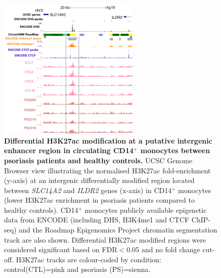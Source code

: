 \begin{figure}[ht]
\centering
\includegraphics[width=0.6\textwidth]{./Results2/pdfs/ChIPm_H3K27ac_UCSC_CD14_ILDR1_track}
\caption[Differential H3K27ac modification at a putative intergenic enhancer region in circulating CD14$^+$ monocytes between psoriasis patients and healthy controls.]{\textbf{Differential H3K27ac modification at a putative intergenic enhancer region in circulating CD14$^+$ monocytes between psoriasis patients and healthy controls.} UCSC Genome Browser view illustrating the normalised H3K27ac fold-enrichment (y-axis) at an intergenic differentially modified region located between \textit{SLC14A2} and \textit{ILDR2} genes (x-axis) in CD14$^+$ monocytes (lower H3K27ac enrichment in psoriasis patients compared to healthy controls). CD14$^+$ monocytes publicly available epigenetic data from ENCODE (including DHS, H3K4me1 and CTCF ChIP-seq) and the Roadmap Epigenomics Project chromatin segmentation track are also shown. Differential H3K27ac modified regions were considered significant based on FDR$<$0.05 and no fold change cut-off. H3K27ac tracks are colour-coded by condition: control(CTL)=pink and psoriasis (PS)=sienna.}
\label{figure:ChIPm_H3K27ac_UCSC_ILDR1_track}
\end{figure}



